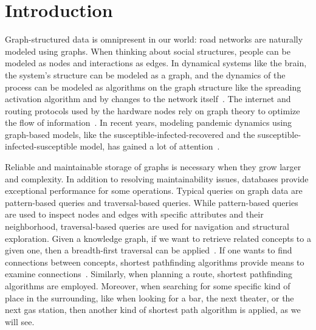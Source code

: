 \chapter{Introduction}\label{\positionnumber}
Graph-structured data is omnipresent in our world:
road networks are naturally modeled using graphs.
When thinking about social structures, people can be modeled as nodes and interactions as edges. 
In dynamical systems like the brain, the system's structure can be modeled as a graph, and the dynamics of the process can be modeled as algorithms on the graph structure like the spreading activation algorithm and by changes to the network itself~\autocite{anderson, dayan1991reinforcing}.
The internet and routing protocols used by the hardware nodes rely on graph theory to optimize the flow of information~\autocite{bgp}.
In recent years, modeling pandemic dynamics using graph-based models, like the susceptible-infected-recovered and the susceptible-infected-susceptible model, has gained a lot of attention~\autocite{kermack1927contribution, dawood2012estimated, sridhar2020modeling, chang2020modeling}.

Reliable and maintainable storage of graphs is necessary when they grow larger and complexity.
In addition to resolving maintainability issues, databases provide exceptional performance for some operations. 
Typical queries on graph data are pattern-based queries and traversal-based queries. 
While pattern-based queries are used to inspect nodes and edges with specific attributes and their neighborhood, traversal-based queries are used for navigation and structural exploration.
Given a knowledge graph, if we want to retrieve related concepts to a given one, then a breadth-first traversal can be applied~\autocite{anderson}. 
If one wants to find connections between concepts, shortest pathfinding algorithms provide means to examine connections~\autocite{minsky1982semantic}.
Similarly, when planning a route, shortest pathfinding algorithms are employed. 
Moreover, when searching for some specific kind of place in the surrounding, like when looking for a bar, the next theater, or the next gas station, then another kind of shortest path algorithm is applied, as we will see.~\autocite{bast2016route} 

